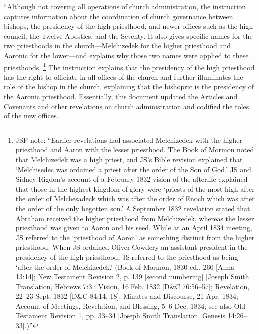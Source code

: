 			``Although not covering all operations of church administration, the instruction captures information about the coordination of church governance between bishops, the presidency of the high priesthood, and newer offices such as the high council, the Twelve Apostles, and the Seventy. It also gives specific names for the two priesthoods in the church---Melchizedek for the higher priesthood and Aaronic for the lower---and explains why those two names were applied to these priesthoods.%
				\footnote{%
					JSP note: ``Earlier revelations had associated Melchizedek with the higher priesthood and Aaron with the lesser priesthood. The Book of Mormon noted that Melchizedek was a high priest, and JS's Bible revision explained that `Melchisedec was ordained a priest after the order of the Son of God.' JS and Sidney Rigdon's account of a February 1832 vision of the afterlife explained that those in the highest kingdom of glory were `priests of the most high after the order of Melchesadeck which was after the order of Enoch which was after the order of the only begotten son.' A September 1832 revelation stated that Abraham received the higher priesthood from Melchizedek, whereas the lesser priesthood was given to Aaron and his seed. While at an April 1834 meeting, JS referred to the `priesthood of Aaron' as something distinct from the higher priesthood. When JS ordained Oliver Cowdery an assistant president in the presidency of the high priesthood, JS referred to the priesthood as being `after the order of Melchizedek.' (Book of Mormon, 1830 ed., 260 [Alma 13:14]; New Testament Revision 2, p. 139 [second numbering] [Joseph Smith Translation, Hebrews 7:3]; Vision, 16 Feb. 1832 [D\&C 76:56--57]; Revelation, 22--23 Sept. 1832 [D\&C 84:14, 18]; Minutes and Discourse, 21 Apr. 1834; Account of Meetings, Revelation, and Blessing, 5--6 Dec. 1834; see also Old Testament Revision 1, pp. 33--34 [Joseph Smith Translation, Genesis 14:26--33].)''
					} 
			The instruction explains that the presidency of the high priesthood has the right to officiate in all offices of the church and further illuminates the role of the bishop in the church, explaining that the bishopric is the presidency of the Aaronic priesthood. Essentially, this document updated the Articles and Covenants and other revelations on church administration and codified the roles of the new offices.
			

